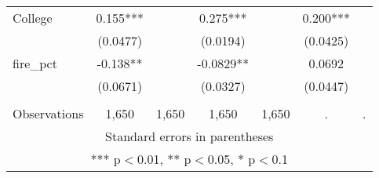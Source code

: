 \begin{tabular}{lcccccc}
College & 0.155*** &  & 0.275*** &  & 0.200*** &  \\
 & (0.0477) &  & (0.0194) &  & (0.0425) &  \\
fire\_pct & -0.138** &  & -0.0829** &  & 0.0692 &  \\
 & (0.0671) &  & (0.0327) &  & (0.0447) &  \\
 &  &  &  &  &  &  \\
 Observations & 1,650 & 1,650 & 1,650 & 1,650 & . & . \\ \hline
\multicolumn{7}{c}{ Standard errors in parentheses} \\
\multicolumn{7}{c}{ *** p$<$0.01, ** p$<$0.05, * p$<$0.1} \\
\end{tabular}
